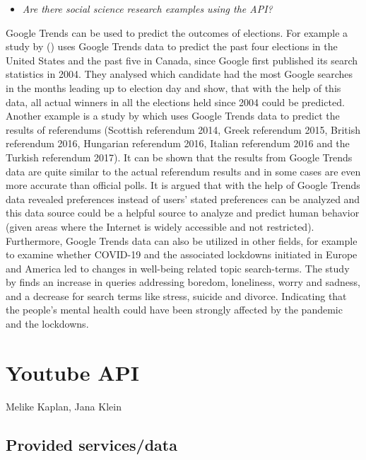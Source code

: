 \documentclass[
]{book}
\providecommand{\tightlist}{%
  \setlength{\itemsep}{0pt}\setlength{\parskip}{0pt}}
\begin{document}
\begin{itemize}
\tightlist
\item
  \emph{Are there social science research examples using the API?}
\end{itemize}

Google Trends can be used to predict the outcomes of elections. For example a study by (\citet{Prado-Roman2021}) uses Google Trends data to predict the past four elections in the United States and the past five in Canada, since Google first published its search statistics in 2004. They analysed which candidate had the most Google searches in the months leading up to election day and show, that with the help of this data, all actual winners in all the elections held since 2004 could be predicted.\\
Another example is a study by \citet{Mavragani2019} which uses Google Trends data to predict the results of referendums (Scottish referendum 2014, Greek referendum 2015, British referendum 2016, Hungarian referendum 2016, Italian referendum 2016 and the Turkish referendum 2017). It can be shown that the results from Google Trends data are quite similar to the actual referendum results and in some cases are even more accurate than official polls. It is argued that with the help of Google Trends data revealed preferences instead of users' stated preferences can be analyzed and this data source could be a helpful source to analyze and predict human behavior (given areas where the Internet is widely accessible and not restricted).\\
Furthermore, Google Trends data can also be utilized in other fields, for example to examine whether COVID-19 and the associated lockdowns initiated in Europe and America led to changes in well-being related topic search-terms. The study by \citet{Brodeur2021} finds an increase in queries addressing boredom, loneliness, worry and sadness, and a decrease for search terms like stress, suicide and divorce. Indicating that the people's mental health could have been strongly affected by the pandemic and the lockdowns.

\hypertarget{youtube-api}{%
\chapter{Youtube API}\label{youtube-api}}

Melike Kaplan, Jana Klein

\hypertarget{provided-servicesdata-8}{%
\section{Provided services/data}\label{provided-servicesdata-8}}
\end{document}
